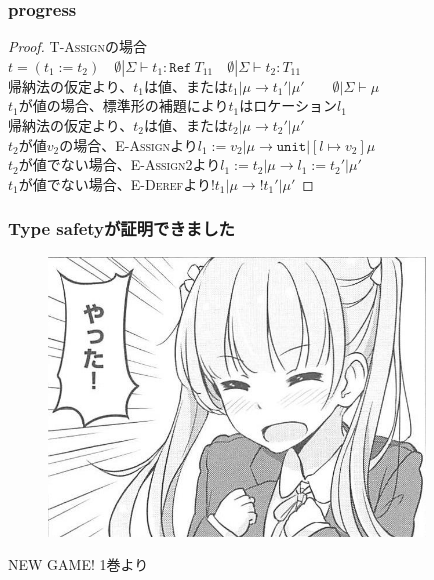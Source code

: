 \documentclass[dvipdfmx,cjk,xcolor=dvipsnames,envcountsect,notheorems]{beamer}
\theoremstyle{definition}
\newcommand{\REFT}{\texttt{Ref}}
\newcommand{\UNIT}{\texttt{unit}}
\begin{document}
\begin{frame}
	\frametitle{progress}
	\Large
	\begin{proof}
		\textsc{T-Assign}の場合\\
		$t = (t_1:=t_2) \quad \emptyset | \Sigma \vdash t_1 : \REFT~T_{11} \quad \emptyset | \Sigma \vdash t_2 : T_{11}$\\
		帰納法の仮定より、$t_1$は値、または$t_1|\mu\rightarrow t_1'|\mu' \qquad \emptyset | \Sigma \vdash \mu$ \\
		$t_1$が値の場合、標準形の補題により$t_1$はロケーション$l_1$\\
		帰納法の仮定より、$t_2$は値、または$t_2|\mu\rightarrow t_2'|\mu'$\\
		$t_2$が値$v_2$の場合、\textsc{E-Assign}より$l_1:=v_2|\mu\rightarrow \UNIT | [l\mapsto v_2]\mu$\\
		$t_2$が値でない場合、\textsc{E-Assign2}より$l_1:=t_2|\mu \rightarrow l_1:=t_2' | \mu'$\\
		$t_1$が値でない場合、\textsc{E-Deref}より$!t_1 | \mu \rightarrow !t_1' | \mu'$
	\end{proof}
\end{frame}

\begin{frame}
	\frametitle{Type safetyが証明できました}
	\begin{figure}[htb]
		\centering
		\includegraphics[width=100mm]{yatta.jpg}
	\end{figure}
	NEW GAME! 1巻より
\end{frame}
\end{document}
